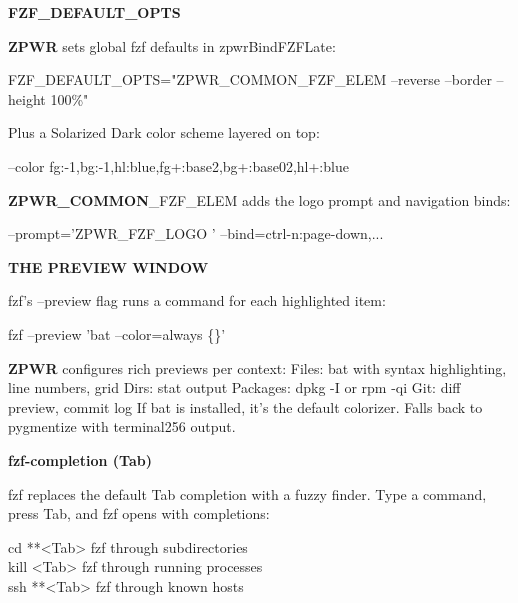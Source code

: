 \documentclass[11pt,a4paper,twoside]{book}
\begin{document}
\vspace{12pt}
{\bfseries\color{neonyellow} FZF\_DEFAULT\_OPTS}\vspace{4pt}

\textbf{ZPWR} sets global fzf defaults in zpwrBindFZFLate:

\begin{codebox}
\color{neongreen}FZF\_DEFAULT\_OPTS="ZPWR\_COMMON\_FZF\_ELEM --reverse --border --height 100\%"\\
\end{codebox}

Plus a Solarized Dark color scheme layered on top:

\begin{codebox}
\color{neongreen}--color fg:-1,bg:-1,hl:blue,fg+:base2,bg+:base02,hl+:blue\\
\end{codebox}

\textbf{ZPWR\_COMMON}\_FZF\_ELEM adds the logo prompt and navigation binds:

\begin{codebox}
\color{neongreen}--prompt='ZPWR\_FZF\_LOGO ' --bind=ctrl-n:page-down,...\\
\end{codebox}


\vspace{12pt}
{\bfseries\color{neonyellow} THE PREVIEW WINDOW}\vspace{4pt}

fzf's --preview flag runs a command for each highlighted item:

\begin{codebox}
\color{neongreen}fzf --preview 'bat --color=always \{\}'\\
\end{codebox}

\textbf{ZPWR} configures rich previews per context: Files:   bat with syntax highlighting, line numbers, grid Dirs:    stat output Packages: dpkg -I or rpm -qi Git:     diff preview, commit log If bat is installed, it's the default colorizer. Falls back to pygmentize with terminal256 output.


\vspace{12pt}
{\bfseries\color{neonyellow} fzf-completion (Tab)}\vspace{4pt}

fzf replaces the default Tab completion with a fuzzy finder. Type a command, press Tab, and fzf opens with completions:

\begin{codebox}
\color{neongreen}cd **<Tab>     fzf through subdirectories\\
\color{neongreen}kill <Tab>      fzf through running processes\\
\color{neongreen}ssh **<Tab>     fzf through known hosts\\
\end{codebox}
\end{document}
